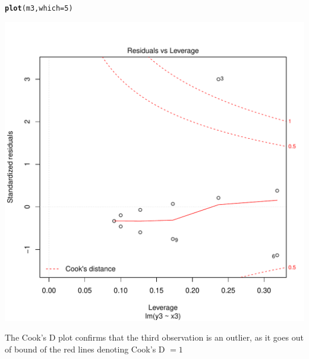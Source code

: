 \documentclass{article}\usepackage[]{graphicx}\usepackage[]{color}
\makeatletter
\def\maxwidth{ %
  \ifdim\Gin@nat@width>\linewidth
    \linewidth
  \else
    \Gin@nat@width
  \fi
}
\newcommand{\hlnum}[1]{\textcolor[rgb]{0.686,0.059,0.569}{#1}}%
\newcommand{\hlstd}[1]{\textcolor[rgb]{0.345,0.345,0.345}{#1}}%
\newcommand{\hlkwc}[1]{\textcolor[rgb]{0.333,0.667,0.333}{#1}}%
\newcommand{\hlkwd}[1]{\textcolor[rgb]{0.737,0.353,0.396}{\textbf{#1}}}%
\newenvironment{kframe}{%
 \def\at@end@of@kframe{}%
 \ifinner\ifhmode%
  \def\at@end@of@kframe{\end{minipage}}%
  \begin{minipage}{\columnwidth}%
 \fi\fi%
 \def\FrameCommand##1{\hskip\@totalleftmargin \hskip-\fboxsep
 \colorbox{shadecolor}{##1}\hskip-\fboxsep
     \hskip-\linewidth \hskip-\@totalleftmargin \hskip\columnwidth}%
 \MakeFramed {\advance\hsize-\width
   \@totalleftmargin\z@ \linewidth\hsize
   \@setminipage}}%
 {\par\unskip\endMakeFramed%
 \at@end@of@kframe}
\newenvironment{knitrout}{}{} %
\makeatother
\begin{document}
\begin{knitrout}
\color{fgcolor}\begin{kframe}
\begin{alltt}
\hlkwd{plot}\hlstd{(m3,} \hlkwc{which} \hlstd{=} \hlnum{5}\hlstd{)}
\end{alltt}
\end{kframe}
\includegraphics[width=\maxwidth]{figure/unnamed-chunk-14-1} 

\end{knitrout}

The Cook's D plot confirms that the third observation is an outlier, as it goes out of bound of the red lines denoting Cook's D $= 1$
\end{document}
